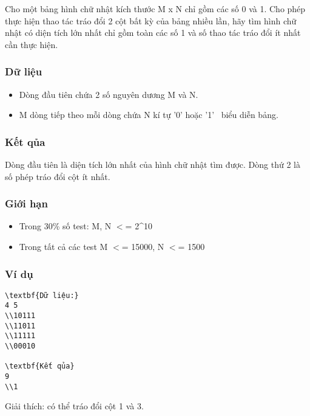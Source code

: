 



   Cho một bảng hình chữ nhật kích thước M x N chỉ gồm các số 0 và 1. Cho phép thực hiện thao tác tráo đổi 2 cột bất kỳ của bảng nhiều lần, hãy tìm hình chữ nhật có diện tích lớn nhất chỉ gồm toàn các số 1 và số thao tác tráo đổi ít nhất cần thực hiện.  

\subsubsection{   Dữ liệu  }
\begin{itemize}
	\item     Dòng đầu tiên chứa 2 số nguyên dương M và N.   
	\item     M dòng tiếp theo mỗi dòng chứa N kí tự '0' hoặc '1'  biểu diễn bảng.   
\end{itemize}

\subsubsection{   Kết qủa  }

   Dòng đầu tiên là diện tích lớn nhất của hình chữ nhật tìm được. Dòng thứ 2 là số phép tráo đổi cột ít nhất.  

\subsubsection{   Giới hạn  }
\begin{itemize}
	\item     Trong 30\% số test: M, N $<$= 2\textasciicircum10   
	\item     Trong tất cả các test M $<$= 15000, N $<$= 1500   
\end{itemize}

\subsubsection{   Ví dụ  }
\begin{verbatim}
\textbf{Dữ liệu:}
4 5
\\10111
\\11011
\\11111
\\00010

\textbf{Kết qủa}
9
\\1
\end{verbatim}

   Giải thích: có thể tráo đổi cột 1 và 3.  
